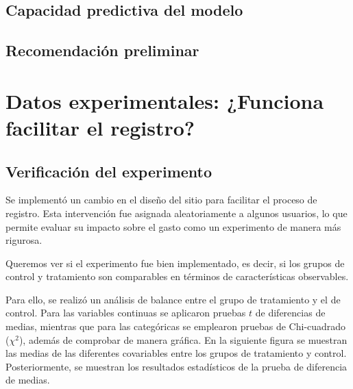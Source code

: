 \documentclass[conference]{IEEEtran}
\begin{document}
\subsection{Capacidad predictiva del modelo}


\subsection{Recomendación preliminar}


\section{Datos experimentales: ¿Funciona facilitar el registro?}

\subsection{Verificación del experimento}

Se implementó un cambio en el diseño del sitio para facilitar el proceso de registro. 
Esta intervención fue asignada aleatoriamente a algunos usuarios, lo que permite evaluar su impacto sobre el gasto 
como un experimento de manera más rigurosa.

Queremos ver si el experimento fue bien implementado, es decir, si los grupos de control y tratamiento son comparables en términos de características observables.

Para ello, se realizó un análisis de balance entre el grupo de tratamiento y el de control. Para las variables continuas se aplicaron pruebas $t$ de diferencias de medias, mientras que para las categóricas se emplearon pruebas de Chi-cuadrado ($\chi^2$), además de comprobar de manera gráfica.
En la siguiente figura se muestran las medias de las diferentes covariables entre los grupos de tratamiento y control. Posteriormente, se muestran los resultados 
estadísticos de la prueba de diferencia de medias.
\end{document}
